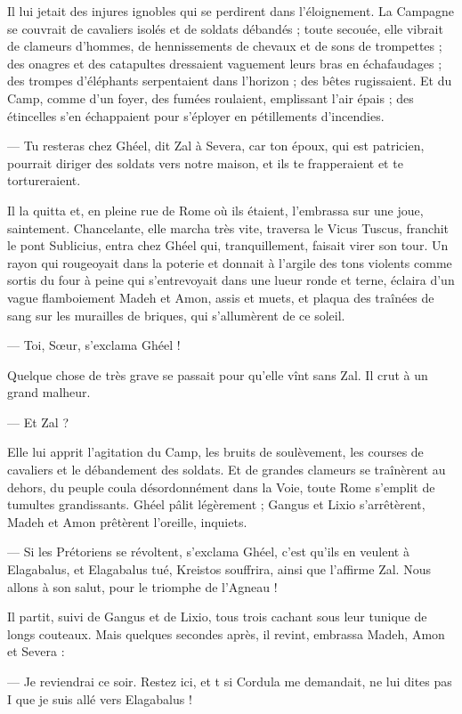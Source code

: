 \documentclass[a4paper, 11pt, oneside, polutonikogreek, french]{article}
\begin{document}
Il lui jetait des injures ignobles qui se perdirent dans l’éloignement. La Campagne se couvrait de cavaliers isolés et de soldats débandés ; toute secouée, elle vibrait de clameurs d'hommes, de hennissements de chevaux et de sons de trompettes ; des onagres et des catapultes dressaient vaguement leurs bras en échafaudages ; des trompes d'éléphants serpentaient dans l'horizon ; des bêtes rugissaient. Et du Camp, comme d'un foyer, des fumées roulaient, emplissant l'air épais ; des étincelles s'en échappaient pour s'éployer en pétillements d'incendies.

--- Tu resteras chez Ghéel, dit Zal à Severa, car ton époux, qui est patricien, pourrait diriger des soldats vers notre maison, et ils te frapperaient et te tortureraient.

Il la quitta et, en pleine rue de Rome où ils étaient, l'embrassa sur une joue, saintement. Chancelante, elle marcha très vite, traversa le Vicus Tuscus, franchit le pont Sublicius, entra chez Ghéel qui, tranquillement, faisait virer son tour. Un rayon qui rougeoyait dans la poterie et donnait à l'argile des tons violents comme sortis du four à peine qui s'entrevoyait dans une lueur ronde et terne, éclaira d'un vague flamboiement Madeh et Amon, assis et muets, et plaqua des traînées de sang sur les murailles de briques, qui s'allumèrent de ce soleil.

--- Toi, Sœur, s'exclama Ghéel !

Quelque chose de très grave se passait pour qu'elle vînt sans Zal. Il crut à un grand malheur.

--- Et Zal ?

Elle lui apprit l'agitation du Camp, les bruits de soulèvement, les courses de cavaliers et le débandement des soldats. Et de grandes clameurs se traînèrent au dehors, du peuple coula désordonnément dans la Voie, toute Rome s'emplit de tumultes grandissants. Ghéel pâlit légèrement ; Gangus et Lixio s'arrêtèrent, Madeh et Amon prêtèrent l'oreille, inquiets.

--- Si les Prétoriens se révoltent, s'exclama Ghéel, c'est qu'ils en veulent à Elagabalus, et Elagabalus tué, Kreistos souffrira, ainsi que l'affirme Zal. Nous allons à son salut, pour le triomphe de l'Agneau !

Il partit, suivi de Gangus et de Lixio, tous trois cachant sous leur tunique de longs couteaux. Mais quelques secondes après, il revint, embrassa Madeh, Amon et Severa :

--- Je reviendrai ce soir. Restez ici, et t si Cordula me demandait, ne lui dites pas I que je suis allé vers Elagabalus !
\end{document}
